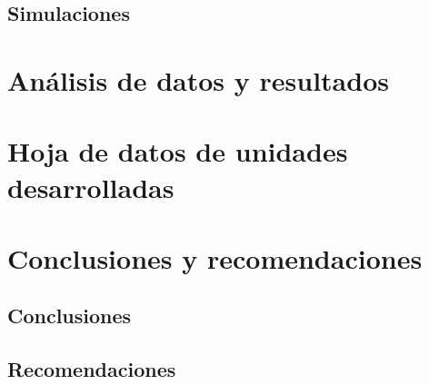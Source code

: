 \documentclass[12pt,a4paper]{article}
\begin{document}
\subsection{Simulaciones}


\section{Análisis de datos y resultados}


\section{Hoja de datos de unidades desarrolladas}


\section{Conclusiones y recomendaciones}
\subsection{Conclusiones}


\subsection{Recomendaciones}
\end{document}
